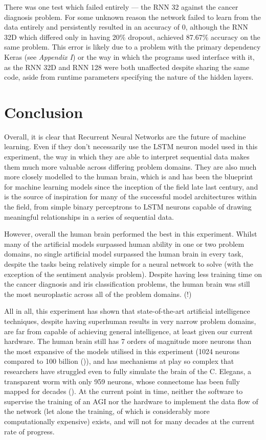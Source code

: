 \documentclass[]{report}
\begin{document}
There was one test which failed entirely --- the RNN 32 against the cancer diagnosis problem. For some unknown reason the network failed to learn from the data entirely and persistently resulted in an accuracy of 0, although the RNN 32D which differed only in having 20\% dropout, achieved 87.67\% accuracy on the same problem. This error is likely due to a problem with the primary dependency Keras (see \textit{Appendix I}) or the way in which the programs used interface with it, as the RNN 32D and RNN 128 were both unaffected despite sharing the same code, aside from runtime parameters specifying the nature of the hidden layers.

\section{Conclusion}

Overall, it is clear that Recurrent Neural Networks are the future of machine learning. Even if they don't necessarily use the LSTM neuron model used in this experiment, the way in which they are able to interpret sequential data makes them much more valuable across differing problem domains. They are also much more closely modelled to the human brain, which is and has been the blueprint for machine learning models since the inception of the field late last century, and is the source of inspiration for many of the successful model architectures within the field, from simple binary perceptrons to LSTM neurons capable of drawing meaningful relationships in a series of sequential data.

However, overall the human brain performed the best in this experiment. Whilst many of the artificial models surpassed human ability in one or two problem domains, no single artificial model surpassed the human brain in every task, despite the tasks being relatively simple for a neural network to solve (with the exception of the sentiment analysis problem). Despite having less training time on the cancer diagnosis and iris classification problems, the human brain was still the most neuroplastic across all of the problem domains. (!)

All in all, this experiment has shown that state-of-the-art artificial intelligence techniques, despite having superhuman results in very narrow problem domains, are far from capable of achieving general intelligence, at least given our current hardware. The human brain still has 7 orders of magnitude more neurons than the most expansive of the models utilised in this experiment (1024 neurons compared to 100 billion (\cite{herculano2009human})), and has mechanisms at play so complex that researchers have struggled even to fully simulate the brain of the C. Elegans, a transparent worm with only 959 neurons, whose connectome has been fully mapped for decades (\cite{wormwiring2012}). At the current point in time, neither the software to supervise the training of an AGI nor the hardware to implement the data flow of the network (let alone the training, of which is considerably more computationally expensive) exists, and will not for many decades at the current rate of progress.
\end{document}
